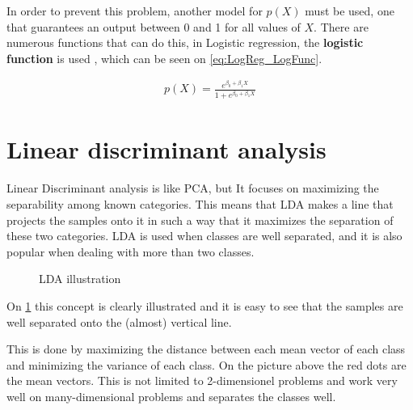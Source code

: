 In order to prevent this problem, another model for $p(X)$ must be used, one that guarantees an output between 0 and 1 for all values of $X$. There are numerous functions that can do this, in Logistic regression, the \textbf{logistic function} is used , which can be seen on \cref{eq:LogReg_LogFunc}.

\begin{equation} \label{eq:LogReg_LogFunc}
\begin{split}
p(X)=\frac{e^{\beta_0 + \beta_1 X}}{1+e^{\beta_0 + \beta_1 X}}
\end{split}
\end{equation}



\section{Linear discriminant analysis}

Linear Discriminant analysis is like PCA, but It focuses on maximizing the separability among known categories. This means that LDA makes a line that projects the samples onto it in such a way that it maximizes the separation of these two categories. LDA is used when classes are well separated, and it is also popular when dealing with more than two classes.

\begin{figure}[H]
	\centering
	\caption{LDA illustration}
	\label{fig:LDA_illustration}
\end{figure}

On \cref{fig:LDA_illustration} this concept is clearly illustrated and it is easy to see that the samples are well separated onto the (almost) vertical line.

This is done by maximizing the distance between each mean vector of each class and minimizing the variance of each class. On the picture above the red dots are the mean vectors. This is not limited to 2-dimensionel problems and work very well on many-dimensional problems and separates the classes well.